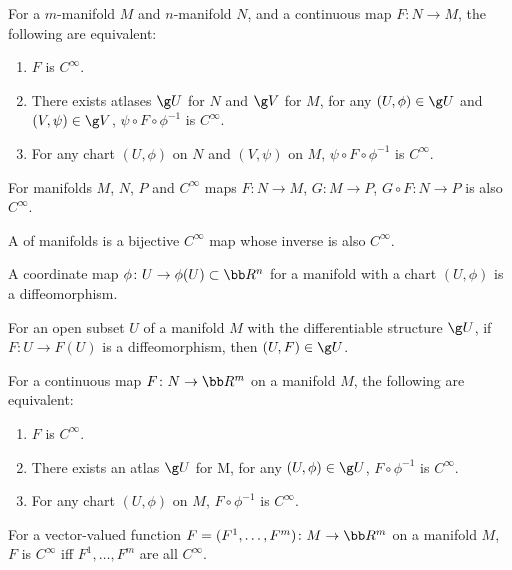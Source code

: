 For a $m$-manifold $M$ and $n$-manifold $N$, and a continuous map $F \colon N \to M$, the following are equivalent:
\begin{enumerate}
\item $F$ is $C^\infty$.
\item There exists atlases $\g U$ for $N$ and $\g V$ for $M$, for any $(U,\phi) \in \g U$ and $(V,\psi) \in \g V$, $\psi \circ F \circ \phi^{-1}$ is $C^\infty$.
\item For any chart $(U,\phi)$ on $N$ and $(V,\psi)$ on $M$, $\psi \circ F \circ \phi^{-1}$ is $C^\infty$.
\end{enumerate}

For manifolds $M$, $N$, $P$ and $C^\infty$ maps $F \colon N \to M$, $G \colon M \to P$, $G \circ F \colon N \to P$ is also $C^\infty$.

A  of manifolds is a bijective $C^\infty$ map whose inverse is also $C^\infty$.

A coordinate map $\phi \colon U \to \phi(U) \subset \bb R^n$ for a manifold with a chart $(U, \phi)$ is a diffeomorphism.

For an open subset $U$ of a manifold $M$ with the differentiable structure $\g U$, if $F \colon U \to F(U)$ is a diffeomorphism, then $(U, F) \in \g U$.

For a continuous map $F \colon N \to \bb R^m$ on a manifold $M$, the following are equivalent:
\begin{enumerate}
\item $F$ is $C^\infty$.
\item There exists an atlas $\g U$ for M, for any $(U, \phi) \in \g U$, $F \circ \phi^{-1}$ is $C^\infty$.
\item For any chart $(U, \phi)$ on $M$, $F \circ \phi^{-1}$ is $C^\infty$.
\end{enumerate}

For a vector-valued function $F = (F^1, \dotsc, F^m) \colon M \to \bb R^m$ on a manifold $M$, $F$ is $C^\infty$ iff $F^1, \dotsc, F^m$ are all $C^\infty$.

